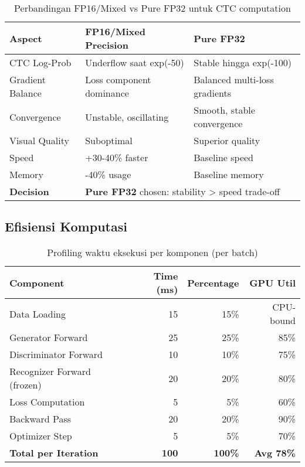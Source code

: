 \documentclass[12pt,a4paper]{article}
\begin{document}
\begin{table}[H]
\centering
\caption{Perbandingan FP16/Mixed vs Pure FP32 untuk CTC computation}
\label{tab:appendix-precision-comparison}
\small
\begin{tabular}{|p{3cm}|p{5cm}|p{5.5cm}|}
\hline
\textbf{Aspect} & \textbf{FP16/Mixed Precision} & \textbf{Pure FP32} \\ \hline
CTC Log-Prob & Underflow saat exp(-50) & Stable hingga exp(-100) \\ \hline
Gradient Balance & Loss component dominance & Balanced multi-loss gradients \\ \hline
Convergence & Unstable, oscillating & Smooth, stable convergence \\ \hline
Visual Quality & Suboptimal & Superior quality \\ \hline
Speed & +30-40\% faster & Baseline speed \\ \hline
Memory & -40\% usage & Baseline memory \\ \hline
\textbf{Decision} & \multicolumn{2}{|l|}{\textbf{Pure FP32} chosen: stability > speed trade-off} \\ \hline
\end{tabular}
\end{table}

\subsection{Efisiensi Komputasi}

\begin{table}[H]
\centering
\caption{Profiling waktu eksekusi per komponen (per batch)}
\label{tab:appendix-timing-profile}
\small
\begin{tabular}{|l|r|r|r|}
\hline
\textbf{Component} & \textbf{Time (ms)} & \textbf{Percentage} & \textbf{GPU Util} \\ \hline
Data Loading & 15 & 15\% & CPU-bound \\ \hline
Generator Forward & 25 & 25\% & 85\% \\ \hline
Discriminator Forward & 10 & 10\% & 75\% \\ \hline
Recognizer Forward (frozen) & 20 & 20\% & 80\% \\ \hline
Loss Computation & 5 & 5\% & 60\% \\ \hline
Backward Pass & 20 & 20\% & 90\% \\ \hline
Optimizer Step & 5 & 5\% & 70\% \\ \hline
\textbf{Total per Iteration} & \textbf{100} & \textbf{100\%} & \textbf{Avg 78\%} \\ \hline
\end{tabular}
\end{table}
\end{document}
